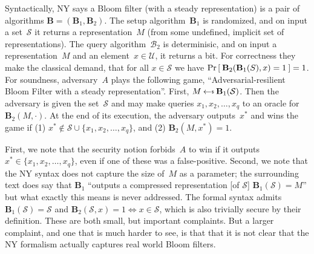  Syntactically, NY says a Bloom filter (with a steady representation) is a pair of algorithms $\mathbf{B}=(\mathbf{B}_1, \mathbf{B}_2)$.  The setup algorithm~$\mathbf{B}_1$ is randomized, and on input a set~$\mathcal{S}$ it returns a representation~$M$ (from some undefined, implicit set of representations).  The query algorithm~$\mathcal{B}_2$ is determinisic, and on input a representation~$M$ and an element~$x \in \mathcal{U}$, it returns a bit.  For correctness they make the classical demand, that for all $x \in \mathcal{S}$ we have $\Pr\left[\: \mathbf{B}_2(\mathbf{B}_1(S),x)=1 \:\right]=1$.  For soundness, adversary~$A$ plays the following game, ``Adversarial-resilient Bloom Filter with a steady representation''.  First, $M \getsr \mathbf{B}_1(\mathcal{S})$.  Then the adversary is given the set~$\mathcal{S}$ and may make queries $x_1,x_2,\ldots,x_q$ to an oracle for $\mathbf{B}_2(M,\cdot)$.  At the end of its execution, the adversary outputs~$x^*$ and wins the game if (1) $x^* \not\in \mathcal{S} \cup \{x_1,x_2,\ldots,x_q\}$, and (2) $\mathbf{B}_2(M,x^*)=1$.

First, we note that the security notion forbids~$A$ to win if it outputs $x^* \in \{x_1,x_2,\ldots,x_q\}$, even if one of these was a false-positive.  
%
Second, we note that the NY syntax does not capture the size of~$M$ as a parameter; the surrounding text does say that $\mathbf{B}_1$ ``outputs a compressed representation [of $\mathcal{S}$] $\mathbf{B}_1(\mathcal{S})=M$'' but what exactly this means is never addressed.  The formal syntax admits $\mathbf{B}_1(\mathcal{S})=\mathcal{S}$ and $\mathbf{B}_2(\mathcal{S},x)=1 \Leftrightarrow x \in \mathcal{S}$, which is also trivially secure by their definition.  These are both small, but important complaints.  But a larger complaint, and one that is much harder to see, is that that it is not clear that the NY formalism actually captures real world Bloom filters.  

